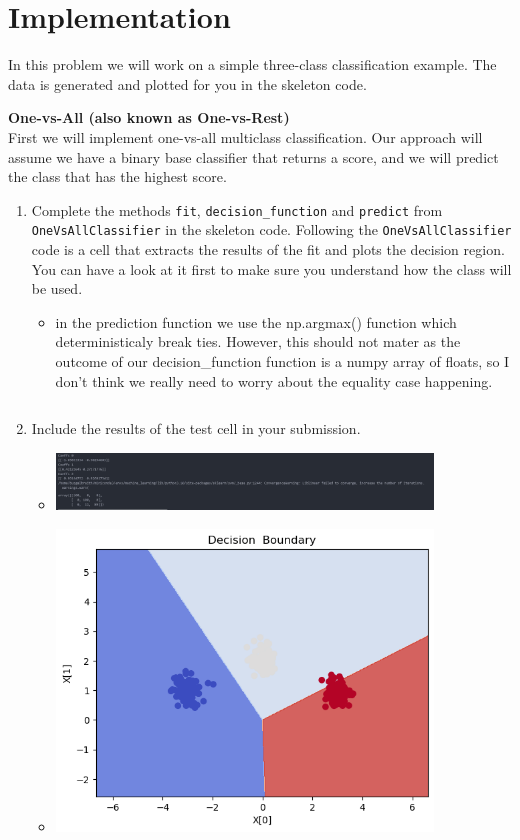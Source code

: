 \documentclass{article}
\newcommand{\nyuparagraph}[1]{\vspace{0.3cm}\textcolor{nyupurple}{\bf \large #1}\\}
\theoremstyle{plain}
\theoremstyle{definition}
\begin{document}
\section{Implementation}

In this problem we will work on a simple three-class classification
example.
The data is generated and plotted for you in the skeleton code. 

\nyuparagraph{One-vs-All (also known as One-vs-Rest)}

First we will implement one-vs-all multiclass classification.
Our approach will assume we have a binary base classifier that returns
a score, and we will predict the class that has the highest score. 
\begin{enumerate}
  \setcounter{enumi}{\value{saveenum}}
\item Complete the methods \texttt{fit}, \texttt{decision\_function} and \texttt{predict} from \texttt{OneVsAllClassifier}  in the skeleton code. Following
the \texttt{OneVsAllClassifier} code is a cell that extracts the results of
the fit and plots the decision region. You can have a look at it first to make sure you understand how the class will be used.
\begin{itemize}
    \color{blue}
    \item in the prediction function we use the np.argmax() function which deterministicaly break ties. However, this should not mater as the outcome of our decision\_function function is a numpy array of floats, so I don't think we really need to worry about the equality case happening. 
           \inputminted[firstline=43, lastline=103, breaklines=True]{python}{hw_5.py}
\end{itemize}

\item  Include the results of the test cell in your submission.
\begin{itemize}
    \color{blue}
    \item 

\includegraphics[width=10cm]{homework/homework_5/immages/q1_1.jpg}\item 
\includegraphics[width=10cm]{homework/homework_5/immages/q1_2.png}
\end{itemize}
\setcounter{saveenum}{\value{enumi}}
\end{enumerate}
\end{document}
